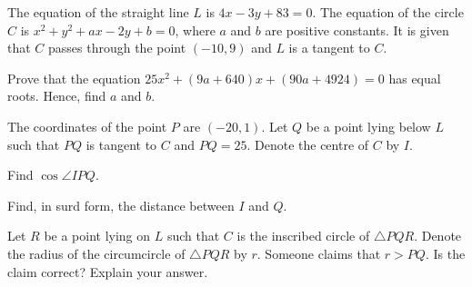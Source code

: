 
The equation of the straight line $L$ is $4x-3y+83=0$. The equation of the circle $C$ is $x^2+y^2+ax-2y+b=0$, where $a$ and $b$ are positive constants. It is given that $C$ passes through the point $(-10,9)$ and $L$ is a tangent to $C$.
\begin{enumx}[label=(\alph*)]
    \item Prove that the equation $25x^2+(9a+640)x+(90a+4924)=0$ has equal roots. Hence, find $a$ and $b$.
    \item The coordinates of the point $P$ are $(-20,1)$. Let $Q$ be a point lying below $L$ such that $PQ$ is tangent to $C$ and $PQ=25$. Denote the centre of $C$ by $I$.
    \begin{enumx}[label=(\roman*)]
        \item Find $\cos\angle IPQ$.
        \item Find, in surd form, the distance between $I$ and $Q$.
        \item Let $R$ be a point lying on $L$ such that $C$ is the inscribed circle of $\triangle PQR$. Denote the radius of the circumcircle of $\triangle PQR$ by $r$. Someone claims that $r>PQ$. Is the claim correct? Explain your answer.
    \end{enumx}
\end{enumx}






